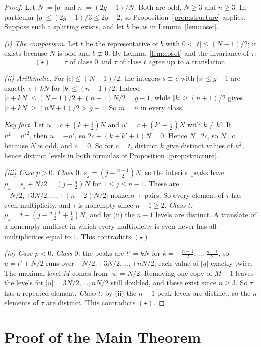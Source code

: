 \documentclass[11pt]{article}
\theoremstyle{definition}
\begin{document}
\begin{proof}
Let $N:=|p|$ and $n:=(2g-1)/N$. Both are odd, $N\ge3$ and $n\ge3$. In particular $|p|\le(2g-1)/3\le2g-2$, so Proposition~\ref{prop:structure} applies. Suppose such a splitting exists, and let $b$ be as in Lemma~\ref{lem:coset}.

\emph{(i) The comparison.} Let $t$ be the representative of $b$ with $0<|t|\le(N-1)/2$; it exists because $N$ is odd and $b\not\equiv0$. By Lemma~\ref{lem:coset} and the invariance of $\tau$:
\[
(\star)\qquad \tau\text{ of class }0\text{ and }\tau\text{ of class }t\text{ agree up to a translation.}
\]

\emph{(ii) Arithmetic.} For $|c|\le(N-1)/2$, the integers $s\equiv c$ with $|s|\le g-1$ are exactly $c+kN$ for $|k|\le(n-1)/2$. Indeed $|c+kN|\le(N-1)/2+(n-1)N/2=g-1$, while $|k|\ge(n+1)/2$ gives $|c+kN|\ge(nN+1)/2>g-1$. So $m=n$ in every class.

\emph{Key fact.} Let $u=c+(k+\tfrac12)N$ and $u'=c+(k'+\tfrac12)N$ with $k\ne k'$. If $u^2=u'^2$, then $u=-u'$, so $2c+(k+k'+1)N=0$. Hence $N\mid 2c$, so $N\mid c$ because $N$ is odd, and $c=0$. So for $c=t$, distinct $k$ give distinct values of $u^2$, hence distinct levels in both formulas of Proposition~\ref{prop:structure}.

\emph{(iii) Case $p>0$.} \emph{Class $0$:} $s_j=(j-\tfrac{n+1}2)N$, so the interior peaks have $\mu_j=s_j+N/2=(j-\tfrac n2)N$ for $1\le j\le n-1$. These are $\pm N/2,\pm3N/2,\dots,\pm(n-2)N/2$: nonzero $\pm$ pairs. So every element of $\tau$ has even multiplicity, and $\tau$ is nonempty since $n-1\ge2$. \emph{Class $t$:} $\mu_j=t+(j-\tfrac{n+1}2+\tfrac12)N$, and by (ii) the $n-1$ levels are distinct. A translate of a nonempty multiset in which every multiplicity is even never has all multiplicities equal to $1$. This contradicts $(\star)$.

\emph{(iv) Case $p<0$.} \emph{Class $0$:} the peaks are $t'=kN$ for $k=-\tfrac{n+1}2,\dots,\tfrac{n-1}2$, so $u=t'+N/2$ runs over $\pm N/2,\pm3N/2,\dots,\pm nN/2$, each value of $|u|$ exactly twice. The maximal level $M$ comes from $|u|=N/2$. Removing one copy of $M-1$ leaves the levels for $|u|=3N/2,\dots,nN/2$ still doubled, and these exist since $n\ge3$. So $\tau$ has a repeated element. \emph{Class $t$:} by (ii) the $n+1$ peak levels are distinct, so the $n$ elements of $\tau$ are distinct. This contradicts $(\star)$.
\end{proof}

\section{Proof of the Main Theorem}\label{sec:proof}
\end{document}
